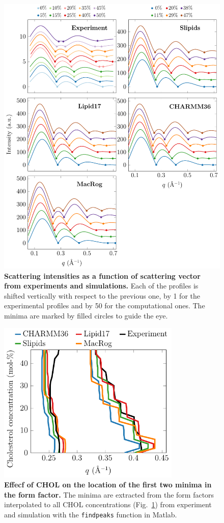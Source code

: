 \documentclass[journal=jpcbfk]{achemso}
\begin{document}
\begin{figure}[htb!]
    \centering
    \includegraphics[width=0.86\linewidth]{../FIGS/scattering.pdf}
    \caption{\label{SIfig:scattering}%
     \textbf{Scattering intensities as a function of scattering vector from experiments and simulations.} Each of the profiles is shifted vertically with respect to the previous one, by 1 for the experimental profiles and by 50 for the computational ones. The minima are marked by filled circles to guide the eye.
    }
\end{figure}

\begin{figure}[htb!]
    \centering
    \includegraphics[width=8.7cm]{../FIGS/ffminima.pdf}
    \caption{\label{SIfig:ffminima}%
    \textbf{Effecf of CHOL on the location of the first two minima in the form factor.}
    The minima are extracted from the form factors interpolated to all CHOL concentrations (Fig.~\ref{SIfig:scattering}) from experiment and simulation with the \texttt{findpeaks} function in Matlab.
    }
\end{figure}
\end{document}
